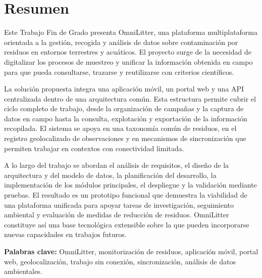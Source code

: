 \chapter*{Resumen}

Este Trabajo Fin de Grado presenta OmniLitter, una plataforma multiplataforma
orientada a la gestión, recogida y análisis de datos sobre contaminación por
residuos en entornos terrestres y acuáticos. El proyecto surge de la necesidad de
digitalizar los procesos de muestreo y unificar la información obtenida en campo
para que pueda consultarse, trazarse y reutilizarse con criterios científicos.

La solución propuesta integra una aplicación móvil, un portal web y una API
centralizada dentro de una arquitectura común. Esta estructura permite cubrir el
ciclo completo de trabajo, desde la organización de campañas y la captura de
datos en campo hasta la consulta, explotación y exportación de la información
recopilada. El sistema se apoya en una taxonomía común de residuos, en el
registro geolocalizado de observaciones y en mecanismos de sincronización que
permiten trabajar en contextos con conectividad limitada.

A lo largo del trabajo se abordan el análisis de requisitos, el diseño de la
arquitectura y del modelo de datos, la planificación del desarrollo, la
implementación de los módulos principales, el despliegue y la validación mediante
pruebas. El resultado es un prototipo funcional que demuestra la viabilidad de
una plataforma unificada para apoyar tareas de investigación, seguimiento
ambiental y evaluación de medidas de reducción de residuos. OmniLitter
constituye así una base tecnológica extensible sobre la que pueden incorporarse
nuevas capacidades en trabajos futuros.

\vspace{.5cm}

\textbf{Palabras clave:} OmniLitter, monitorización de residuos, aplicación
móvil, portal web, geolocalización, trabajo sin conexión, sincronización,
análisis de datos ambientales.

